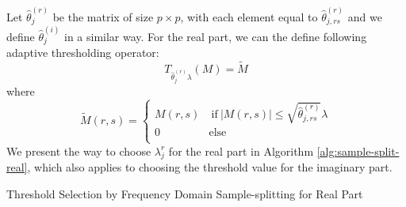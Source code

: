Let $\hat{\theta}_j^{(r)}$ be the matrix of size $p\times p$, with each element equal to  $\hat{\theta}^{(r)}_{j, rs}$ and we define $\hat{\theta}_j^{(i)}$ in a similar way. For the real part, we can the define following adaptive thresholding operator:
\begin{equation}
T_{\hat{\theta}_j^{(r)}\lambda} (M) = \tilde{M} 
\end{equation}
where 
\begin{equation}
\tilde{M} (r, s) = \begin{cases}
M(r, s) & ~\text{if}~ |M(r, s)| \le \sqrt{\hat{\theta}^{(r)}_{j, rs}}\lambda  \\
0 & \text{else}
\\
\end{cases}
\end{equation}
We present the way to choose $\lambda^r_j$ for the real part in Algorithm \ref{alg:sample-split-real}, which also applies to choosing the threshold value for the imaginary part. 



\begin{algorithm2e}[t]\small
	\DontPrintSemicolon 
	\caption{Threshold Selection by Frequency Domain Sample-splitting for Real Part}
	\label{alg:sample-split-real}
	\label{al1}
\end{algorithm2e}


